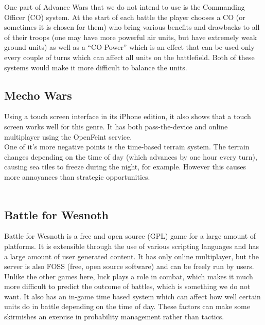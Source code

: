 \documentclass[10pt,a4paper,oneside]{report}
\begin{document}
One part of Advance Wars that we do not intend to use is the Commanding Officer (CO) system. At the start of each battle the player chooses a CO (or sometimes it is chosen for them) who bring various benefits and drawbacks to all of their troops (one may have more powerful air units, but have extremely weak ground units) as well as a ``CO Power'' which is an effect that can be used only every couple of turns which can affect all units on the battlefield. Both of these systems would make it more difficult to balance the units.\\



\subsection*{Mecho Wars}
Using a touch screen interface in its iPhone edition, it also shows that a touch screen works well for this genre. It has both pass-the-device and online multiplayer using the OpenFeint service.\\


One of it's more negative points is the time-based terrain system. The terrain changes depending on the time of day (which advances by one hour every turn), causing sea tiles to freeze during the night, for example. However this causes more annoyances than strategic opportunities.\\\\

\clearpage
\subsection*{Battle for Wesnoth}
Battle for Wesnoth is a free and open source (GPL) game for a large amount of platforms. It is extensible through the use of various scripting languages and has a large amount of user generated content. It has only online multiplayer, but the server is also FOSS (free, open source software) and can be freely run by users.\\


Unlike the other games here, luck plays a role in combat, which makes it much more difficult to predict the outcome of battles, which is something we do not want. It also has an in-game time based system which can affect how well certain units do in battle depending on the time of day. These factors can make some skirmishes an exercise in probability management rather than tactics.\\
\end{document}
